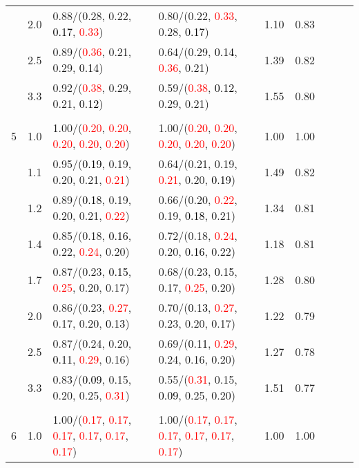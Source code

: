 \documentclass[10pt,a4paper]{report}
\begin{document}
\begin{table}[!htbp]
\begin{center}
{\begin{tabular}{ccllccccc}
			&2.0&0.88/(0.28, 0.22, \textcolor{black}{0.17}, \textcolor{red}{0.33})&0.80/(0.22, \textcolor{red}{0.33}, 0.28, \textcolor{black}{0.17})&1.10&0.83\\
			&2.5&0.89/(\textcolor{red}{0.36}, 0.21, 0.29, \textcolor{black}{0.14})&0.64/(0.29, \textcolor{black}{0.14}, \textcolor{red}{0.36}, 0.21)&1.39&0.82\\
			&3.3&0.92/(\textcolor{red}{0.38}, 0.29, 0.21, \textcolor{black}{0.12})&0.59/(\textcolor{red}{0.38}, \textcolor{black}{0.12}, 0.29, 0.21)&1.55&0.80\\
			&&&&\\
			5			&1.0&1.00/(\textcolor{red}{0.20}, \textcolor{red}{0.20}, \textcolor{red}{0.20}, \textcolor{red}{0.20}, \textcolor{red}{0.20})&1.00/(\textcolor{red}{0.20}, \textcolor{red}{0.20}, \textcolor{red}{0.20}, \textcolor{red}{0.20}, \textcolor{red}{0.20})&1.00&1.00\\
			&1.1&0.95/(\textcolor{black}{0.19}, 0.19, 0.20, 0.21, \textcolor{red}{0.21})&0.64/(0.21, 0.19, \textcolor{red}{0.21}, 0.20, \textcolor{black}{0.19})&1.49&0.82\\
			&1.2&0.89/(\textcolor{black}{0.18}, 0.19, 0.20, 0.21, \textcolor{red}{0.22})&0.66/(0.20, \textcolor{red}{0.22}, 0.19, \textcolor{black}{0.18}, 0.21)&1.34&0.81\\
			&1.4&0.85/(0.18, \textcolor{black}{0.16}, 0.22, \textcolor{red}{0.24}, 0.20)&0.72/(0.18, \textcolor{red}{0.24}, 0.20, \textcolor{black}{0.16}, 0.22)&1.18&0.81\\
			&1.7&0.87/(0.23, \textcolor{black}{0.15}, \textcolor{red}{0.25}, 0.20, 0.17)&0.68/(0.23, \textcolor{black}{0.15}, 0.17, \textcolor{red}{0.25}, 0.20)&1.28&0.80\\
			&2.0&0.86/(0.23, \textcolor{red}{0.27}, 0.17, 0.20, \textcolor{black}{0.13})&0.70/(\textcolor{black}{0.13}, \textcolor{red}{0.27}, 0.23, 0.20, 0.17)&1.22&0.79\\
			&2.5&0.87/(0.24, 0.20, \textcolor{black}{0.11}, \textcolor{red}{0.29}, 0.16)&0.69/(\textcolor{black}{0.11}, \textcolor{red}{0.29}, 0.24, 0.16, 0.20)&1.27&0.78\\
			&3.3&0.83/(\textcolor{black}{0.09}, 0.15, 0.20, 0.25, \textcolor{red}{0.31})&0.55/(\textcolor{red}{0.31}, 0.15, \textcolor{black}{0.09}, 0.25, 0.20)&1.51&0.77\\
			&&&&\\
			6			&1.0&1.00/(\textcolor{red}{0.17}, \textcolor{red}{0.17}, \textcolor{red}{0.17}, \textcolor{red}{0.17}, \textcolor{red}{0.17}, \textcolor{red}{0.17})&1.00/(\textcolor{red}{0.17}, \textcolor{red}{0.17}, \textcolor{red}{0.17}, \textcolor{red}{0.17}, \textcolor{red}{0.17}, \textcolor{red}{0.17})&1.00&1.00\\

\end{tabular}}
\end{center}
\end{table}
\end{document}
